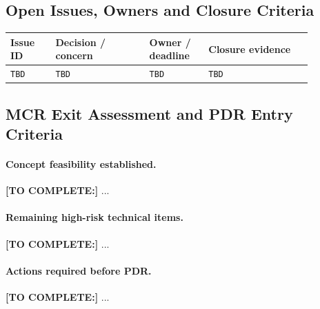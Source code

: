 \subsection{Open Issues, Owners and Closure Criteria}\label{sec:open-issues}
\begin{longtable}{p{0.13\linewidth}p{0.27\linewidth}p{0.17\linewidth}p{0.30\linewidth}}
\toprule
Issue ID & Decision / concern & Owner / deadline & Closure evidence \\
\midrule
\endhead
\texttt{TBD} & \texttt{TBD} & \texttt{TBD} & \texttt{TBD} \\
\bottomrule
\end{longtable}

\subsection{MCR Exit Assessment and PDR Entry Criteria}\label{sec:mcr-exit}
\paragraph{Concept feasibility established.} \textbf{[TO COMPLETE:]} ...
\paragraph{Remaining high-risk technical items.} \textbf{[TO COMPLETE:]} ...
\paragraph{Actions required before PDR.} \textbf{[TO COMPLETE:]} ...
